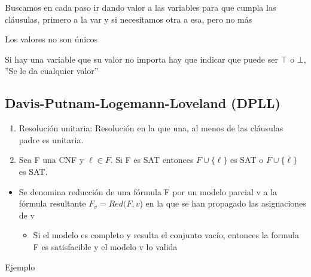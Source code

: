 \documentclass[12pt, twoside, openright]{report} %
\begin{document}
Buscamos en cada paso ir dando valor a las variables para que cumpla las cláusulas, primero a la var y si necesitamos otra a esa, pero no más

Los valores no son únicos

Si hay una variable que su valor no importa hay que indicar que puede ser $\top$ o $\bot$, ''Se le da cualquier valor''


\subsection{Davis-Putnam-Logemann-Loveland (DPLL)}

\begin{enumerate}
	\def\labelenumi{\arabic{enumi}.}
	\item Resolución unitaria: Resolución en la que una, al menos de las
	      cláusulas padre es unitaria.
	\item Sea F una CNF y \(\ell \in F\). Si F es SAT entonces
	      \(F \cup \{ \ell \}\) es SAT o \(F \cup \{ \overline{\ell} \}\) es
	      SAT.
\end{enumerate}

\begin{itemize}
	\item Se denomina reducción de una fórmula F por un modelo parcial v a la
	      fórmula resultante \(F_v = Red(F, v\)) en la que se han propagado
	      las asignaciones de v

	      \begin{itemize}
		      \item Si el modelo es completo y resulta el conjunto vacío, entonces la
		            formula F es satisfacible y el modelo v lo valida
	      \end{itemize}
\end{itemize}

Ejemplo
\end{document}
